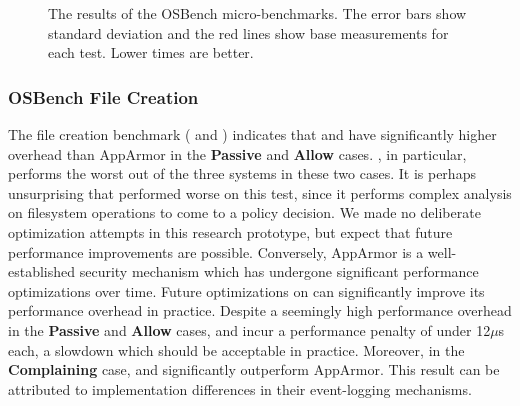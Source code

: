 \begin{figure}[htp]
{  }
  \caption[The results of the OSBench micro-benchmarks]{
    The results of the OSBench micro-benchmarks. The error bars show standard
    deviation and the red lines show base measurements for each test. Lower times are
    better.
  }%
  \label{fig:osbench}
\end{figure}

\subsubsection{OSBench File Creation}

The file creation benchmark ( and )
indicates that \bpfbox{} and \bpfcontain{} have significantly higher overhead than
AppArmor in the \textbf{Passive} and \textbf{Allow} cases. \bpfcontain{}, in particular,
performs the worst out of the three systems in these two cases. It is perhaps unsurprising
that \bpfcontain{} performed worse on this test, since it performs complex analysis on
filesystem operations to come to a policy decision. We made no deliberate optimization
attempts in this research prototype, but expect that future performance improvements are
possible.  Conversely, AppArmor is a well-established security mechanism which has
undergone significant performance optimizations over time. Future optimizations on
\bpfcontain{} can significantly improve its performance overhead in practice. Despite
a seemingly high performance overhead in the \textbf{Passive} and \textbf{Allow} cases,
\bpfbox{} and \bpfcontain{} incur a performance penalty of under 12$\mu$s each, a slowdown
which should be acceptable in practice.  Moreover, in the \textbf{Complaining} case,
\bpfbox{} and \bpfcontain{} significantly outperform AppArmor. This result can be
attributed to implementation differences in their event-logging mechanisms.

